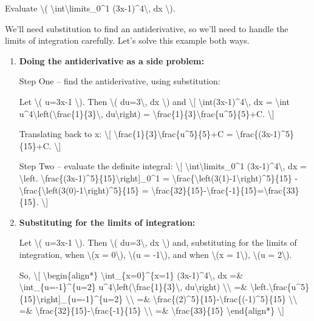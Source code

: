 Evaluate \textbackslash{}(
\textbackslash{}int\textbackslash{}limits\_0\^{}1
(3x-1)\^{}4\textbackslash{}, dx \textbackslash{}).

We'll need substitution to find an antiderivative, so we'll need to
handle the limits of integration carefully. Let's solve this example
both ways.

\begin{enumerate}
\item
  \textbf{Doing the antiderivative as a side problem:}

  Step One -- find the antiderivative, using substitution:

  Let \textbackslash{}( u=3x-1 \textbackslash{}). Then \textbackslash{}(
  du=3\textbackslash{}, dx \textbackslash{}) and \textbackslash{}{[}
  \textbackslash{}int(3x-1)\^{}4\textbackslash{}, dx =
  \textbackslash{}int
  u\^{}4\textbackslash{}left(\textbackslash{}frac\{1\}\{3\}\textbackslash{},
  du\textbackslash{}right) =
  \textbackslash{}frac\{1\}\{3\}\textbackslash{}frac\{u\^{}5\}\{5\}+C.
  \textbackslash{}{]}

  Translating back to x: \textbackslash{}{[}
  \textbackslash{}frac\{1\}\{3\}\textbackslash{}frac\{u\^{}5\}\{5\}+C =
  \textbackslash{}frac\{(3x-1)\^{}5\}\{15\}+C. \textbackslash{}{]}

  Step Two -- evaluate the definite integral: \textbackslash{}{[}
  \textbackslash{}int\textbackslash{}limits\_0\^{}1
  (3x-1)\^{}4\textbackslash{}, dx = \textbackslash{}left.
  \textbackslash{}frac\{(3x-1)\^{}5\}\{15\}\textbackslash{}right{]}\_0\^{}1
  =
  \textbackslash{}frac\{\textbackslash{}left(3(1)-1\textbackslash{}right)\^{}5\}\{15\}
  -
  \textbackslash{}frac\{\textbackslash{}left(3(0)-1\textbackslash{}right)\^{}5\}\{15\}
  =
  \textbackslash{}frac\{32\}\{15\}-\textbackslash{}frac\{-1\}\{15\}=\textbackslash{}frac\{33\}\{15\}.
  \textbackslash{}{]}
\item
  \textbf{Substituting for the limits of integration:}

  Let \textbackslash{}( u=3x-1 \textbackslash{}). Then \textbackslash{}(
  du=3\textbackslash{}, dx \textbackslash{}) and, substituting for the
  limits of integration, when \textbackslash{}(x = 0\textbackslash{}),
  \textbackslash{}(u = -1\textbackslash{}), and when \textbackslash{}(x
  = 1\textbackslash{}), \textbackslash{}(u = 2\textbackslash{}).

  So, \textbackslash{}{[} \textbackslash{}begin\{align*\}
  \textbackslash{}int\_\{x=0\}\^{}\{x=1\} (3x-1)\^{}4\textbackslash{},
  dx =\& \textbackslash{}int\_\{u=-1\}\^{}\{u=2\}
  u\^{}4\textbackslash{}left(\textbackslash{}frac\{1\}\{3\}\textbackslash{},
  du\textbackslash{}right) \textbackslash{}\textbackslash{} =\&
  \textbackslash{}left.\textbackslash{}frac\{u\^{}5\}\{15\}\textbackslash{}right{]}\_\{u=-1\}\^{}\{u=2\}
  \textbackslash{}\textbackslash{} =\&
  \textbackslash{}frac\{(2)\^{}5\}\{15\}-\textbackslash{}frac\{(-1)\^{}5\}\{15\}
  \textbackslash{}\textbackslash{} =\&
  \textbackslash{}frac\{32\}\{15\}-\textbackslash{}frac\{-1\}\{15\}
  \textbackslash{}\textbackslash{} =\& \textbackslash{}frac\{33\}\{15\}
  \textbackslash{}end\{align*\} \textbackslash{}{]}
\end{enumerate}


